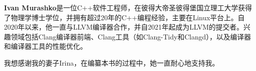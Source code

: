 \textbf{Ivan Murashko}是一位C++软件工程师，在彼得大帝圣彼得堡国立理工大学获得了物理学博士学位，并拥有超过20年的C++编程经验，主要在Linux平台上。自2020年以来，他一直与LLVM编译器合作，并自2021年起成为LLVM的提交者。兴趣领域包括Clang编译器前端、Clang工具（如Clang-Tidy和Clangd），以及编译器和编译器工具的性能优化。

我想感谢我的妻子Irina，在编纂本书的过程中，她一直耐心地支持我。


